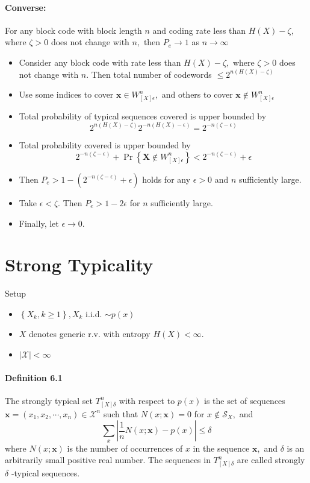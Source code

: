 \documentclass[8pt]{article}
\begin{document}
\paragraph{Converse:} For any block code with block length $n$ and coding rate less than $H(X)-\zeta,$ where $\zeta>0$ does not change with $n,$ then $P_{e} \rightarrow 1$ as
$n \rightarrow \infty$
\begin{itemize}
	\item Consider any block code with rate less than $H(X)-\zeta,$ where $\zeta>0$ does not change with $n .$ Then total number of codewords $\leq 2^{n(H(X)-\zeta)}$
	\item Use some indices to cover $\mathbf{x} \in W_{[X] \epsilon}^{n},$ and others to cover $\mathbf{x} \notin W_{[X] \epsilon}^{n}$
	\item Total probability of typical sequences covered is upper bounded by
	$$
	2^{n(H(X)-\zeta)} 2^{-n(H(X)-\epsilon)}=2^{-n(\zeta-\epsilon)}
	$$
	\item Total probability covered is upper bounded by
	$$
	2^{-n(\zeta-\epsilon)}+\operatorname{Pr}\left\{\mathbf{X} \notin W_{[X] \epsilon}^{n}\right\}<2^{-n(\zeta-\epsilon)}+\epsilon
	$$
	\item Then $P_{e}>1-\left(2^{-n(\zeta-\epsilon)}+\epsilon\right)$ holds for any $\epsilon>0$ and $n$ sufficiently large.
	\item Take $\epsilon<\zeta .$ Then $P_{e}>1-2 \epsilon$ for $n$ sufficiently large.
	\item Finally, let $\epsilon \rightarrow 0$.
\end{itemize}

\section{Strong Typicality}
Setup
\begin{itemize}
	\item $\left\{X_{k}, k \geq 1\right\}, X_{k}$ i.i.d. $\sim p(x)$
	\item $X$ denotes generic $\mathrm{r}$.v. with entropy $H(X)<\infty$.
	\item $|\mathcal{X}|<\infty$
\end{itemize}

\paragraph{Definition 6.1} The strongly typical set $T_{[X] \delta}^{n}$ with respect to $p(x)$ is the set of sequences $\mathbf{x}=\left(x_{1}, x_{2}, \cdots, x_{n}\right) \in \mathcal{X}^{n}$ such that $N(x ; \mathbf{x})=0$ for $x \notin \mathcal{S}_{X},$ and
$$
\sum_{x}\left|\frac{1}{n} N(x ; \mathbf{x})-p(x)\right| \leq \delta
$$
where $N(x ; \mathbf{x})$ is the number of occurrences of $x$ in the sequence $\mathbf{x},$ and $\delta$ is an arbitrarily small positive real number. The sequences in $T_{[X] \delta}^{n}$ are called strongly $\delta$ -typical sequences.
\end{document}
